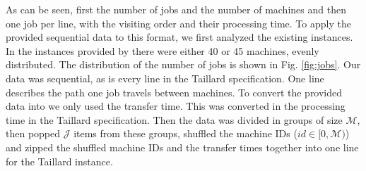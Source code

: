 

As can be seen, first the number of jobs and the number of machines and then
one job per line, with the visiting order and their processing time. To apply
the provided sequential data to this format, we first analyzed the existing
instances. In the instances provided by  there were either
40 or 45 machines, evenly distributed. The distribution of the number of jobs
is shown in Fig. \ref{fig:jobs}. Our data was sequential, as is every line in
the Taillard specification. One line describes the path one job travels
between machines. To convert the provided data into we only used the transfer
time. This was converted in the processing time in the Taillard specification.
Then the data was divided in groups of size $\mathcal{M}$, then popped
$\mathcal{J}$ items from these groups, shuffled the machine IDs ($id \in [0,
\mathcal{M})$) and zipped the shuffled machine IDs and the transfer times
together into one line for the Taillard instance.











